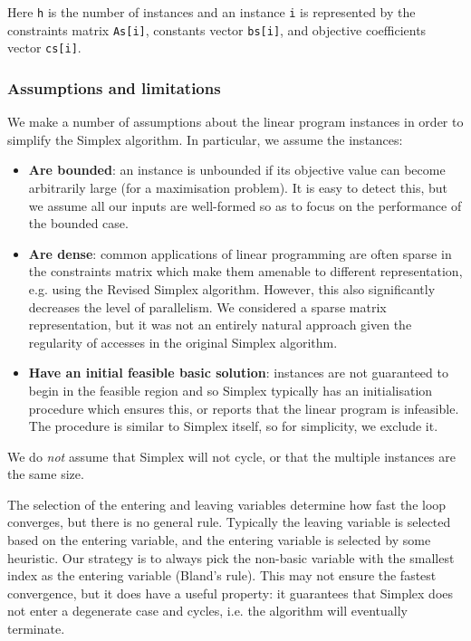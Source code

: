 Here \texttt{h} is the number of instances and an instance \texttt{i} is represented by the constraints matrix \texttt{As[i]}, constants vector \texttt{bs[i]}, and objective coefficients vector \texttt{cs[i]}.

\subsubsection{Assumptions and limitations}
We make a number of assumptions about the linear program instances in order to simplify the Simplex algorithm. In particular, we assume the instances:
\begin{itemize}
\item \textbf{Are bounded}: an instance is unbounded if its objective value can become arbitrarily large (for a maximisation problem). It is easy to detect this, but we assume all our inputs are well-formed so as to focus on the performance of the bounded case.
\item \textbf{Are dense}: common applications of linear programming are often sparse in the constraints matrix which make them amenable to different representation, e.g. using the Revised Simplex algorithm. However, this also significantly decreases the level of parallelism. We considered a sparse matrix representation, but it was not an entirely natural approach given the regularity of accesses in the original Simplex algorithm.
\item \textbf{Have an initial feasible basic solution}: instances are not guaranteed to begin in the feasible region and so Simplex typically has an initialisation procedure which ensures this, or reports that the linear program is infeasible. The procedure is similar to Simplex itself, so for simplicity, we exclude it.
\end{itemize}
We do \textit{not} assume that Simplex will not cycle, or that the multiple instances are the same size.

The selection of the entering and leaving variables determine how fast the loop converges, but there is no general rule. Typically the leaving variable is selected based on the entering variable, and the entering variable is selected by some heuristic. Our strategy is to always pick the non-basic variable with the smallest index as the entering variable (Bland's rule). This may not ensure the fastest convergence, but it does have a useful property: it guarantees that Simplex does not enter a degenerate case and cycles, i.e. the algorithm will eventually terminate.

